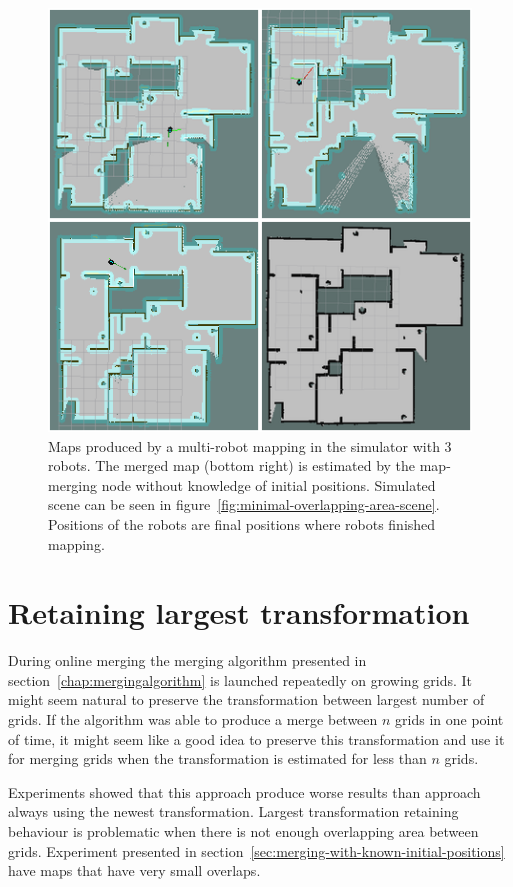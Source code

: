 \begin{figure}
    \centering
    \includegraphics[width=4.44in]{../img/minimal-overlapping-area-final-maps.png}
    \caption[Maps produced by a multi-robot mapping in the simulator.]{Maps produced by a multi-robot mapping in the simulator with $3$ robots. The merged map (bottom right) is estimated by the map-merging node without knowledge of initial positions. Simulated scene can be seen in figure~\ref{fig:minimal-overlapping-area-scene}. Positions of the robots are final positions where robots finished mapping.}
    \label{fig:minimal-overlapping-area-final-maps}
\end{figure}

\section{Retaining largest transformation}
\label{sec:retaining-largest-transformation}

During online merging the merging algorithm presented in section~\ref{chap:mergingalgorithm} is launched repeatedly on growing grids. It might seem natural to preserve the transformation between largest number of grids. If the algorithm was able to produce a merge between $n$ grids in one point of time, it might seem like a good idea to preserve this transformation and use it for merging grids when the transformation is estimated for less than $n$ grids.

Experiments showed that this approach produce worse results than approach always using the newest transformation. Largest transformation retaining behaviour is problematic when there is not enough overlapping area between grids. Experiment presented in section~\ref{sec:merging-with-known-initial-positions} have maps that have very small overlaps.

